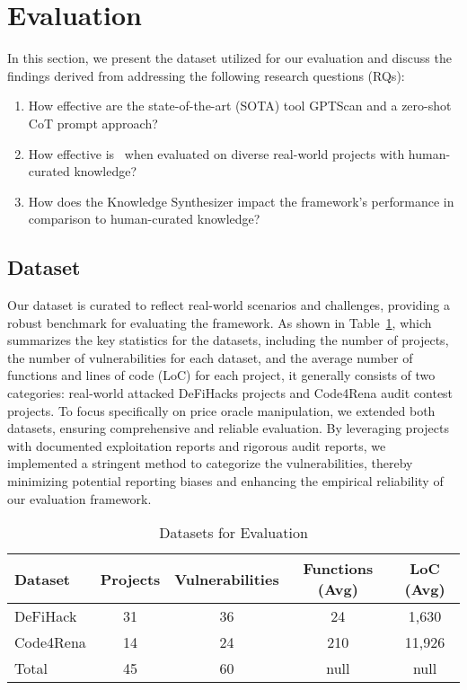 \section{Evaluation}\label{sec:evaluation}
In this section, we present the dataset utilized for our evaluation and discuss the findings derived from addressing the following research questions (RQs):

\begin{enumerate}[label=RQ\arabic*:, left=1em] 
\item How effective are the state-of-the-art (SOTA) tool GPTScan and a zero-shot CoT prompt approach?
\item How effective is \tool~when evaluated on diverse real-world projects with human-curated knowledge?
\item How does the Knowledge Synthesizer impact the framework's performance in comparison to human-curated knowledge?
\end{enumerate}


\subsection{Dataset} \label{dataset}
Our dataset is curated to reflect real-world scenarios and challenges, providing a robust benchmark for evaluating the framework. As shown in Table~\ref{table:dataset}, which summarizes the key statistics for the datasets, including the number of projects, the number of vulnerabilities for each dataset, and the average number of functions and lines of code (LoC) for each project, it generally consists of two categories: real-world attacked DeFiHacks projects and Code4Rena audit contest projects. To focus specifically on price oracle manipulation, we extended both datasets, ensuring comprehensive and reliable evaluation. 
By leveraging projects with documented exploitation reports and rigorous audit reports, we implemented a stringent method to categorize the vulnerabilities, thereby minimizing potential reporting biases and enhancing the empirical reliability of our evaluation framework. 

\begin{table}
    \caption{Datasets for Evaluation}
    \label{table:dataset}
    \begin{tabular}{@{}lcccc@{}}
    \toprule
    Dataset  & Projects & Vulnerabilities & Functions (Avg) & LoC (Avg)\\ \midrule
    DeFiHack  & 31       & 36      & 24  &  1,630 \\
    Code4Rena  & 14       & 24      & 210 & 11,926   \\ \midrule
    Total & 45       & 60      & null  & null   \\ \bottomrule
    \end{tabular}
\end{table}

